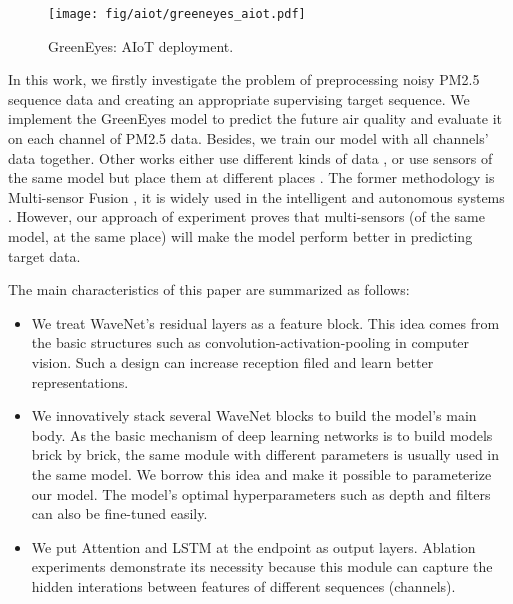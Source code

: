 \documentclass[
twocolumn,
]{ceurart}
\begin{document}
\begin{figure}[!htbp]
    \begin{center}
    \texttt{[image: fig/aiot/greeneyes\_aiot.pdf]}
    \end{center}
    \caption{GreenEyes: AIoT deployment.}
    \label{fig:greeneyes_aiot}
\end{figure}

In this work, we firstly investigate the problem of preprocessing noisy PM2.5 sequence data and creating an appropriate supervising target sequence. We implement the GreenEyes model to predict the future air quality and evaluate it on each channel of PM2.5 data. Besides, we train our model with all channels' data together. Other works either use different kinds of data \cite{han2020joint}, or use sensors of the same model but place them at different places \cite{ray2016internet}. The former methodology is Multi-sensor Fusion \cite{wang2019multi}, it is widely used in the intelligent and autonomous systems \cite{luo1989multisensor, hall1997introduction, wang2012towards, cai2020probabilistic}. However, our approach of experiment proves that multi-sensors (of the same model, at the same place) will make the model perform better in predicting target data.

The main characteristics of this paper are summarized as follows:
\begin{itemize}
\item We treat WaveNet's residual layers as a feature block. This idea comes from the basic structures such as convolution-activation-pooling in computer vision. Such a design can increase reception filed and learn better representations.
\item We innovatively stack several WaveNet blocks to build the model's main body. As the basic mechanism of deep learning networks is to build models brick by brick, the same module with different parameters is usually used in the same model. We borrow this idea and make it possible to parameterize our model. The model's optimal hyperparameters such as depth and filters can also be fine-tuned easily.
\item We put Attention \cite{bahdanau2014neural} and LSTM \cite{hochreiter1997long} at the endpoint as output layers. Ablation experiments demonstrate its necessity because this module can capture the hidden interations between features of different sequences (channels).
\end{itemize}
\end{document}
